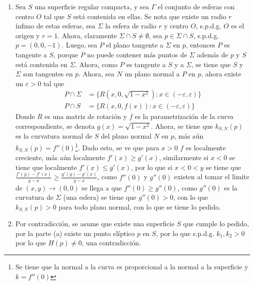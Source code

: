 \documentclass{homework}
\begin{document}
\begin{sol}[4]
    \begin{enumerate}
        \item Sea \(S\) una superficie regular compacta, y sea \(\Gamma\) el conjunto de esferas con centro \(O\) tal que \(S\) está contenida en ellas. Se nota que existe un radio \(r\) ínfimo de estas esferas, sea \(\Sigma\) la esfera de radio \(r\) y centro \(O\), s.p.d.g. \(O\) es el origen y \(r=1\). Ahora, claramente \(\Sigma\cap S\neq\emptyset\), sea \(p\in\Sigma\cap S\), s.p.d.g. \(p=(0,0,-1)\). Luego, sea \(P\) el plano tangente a \(\Sigma\) en \(p\), entonces \(P\) es tangente a \(S\), porque \(P\) no puede contener más puntos de \(\Sigma\) además de \(p\) y \(S\) está contenida en \(\Sigma\). Ahora, como \(P\) es tangente a \(S\) y a \(\Sigma\), se tiene que \(S\) y \(\Sigma\) son tangentes en \(p\). Ahora, sea \(N\) un plano normal a \(P\) en \(p\), ahora existe un \(\varepsilon>0\) tal que
        \begin{align*}
            P\cap\Sigma&=\{R(x,0,\sqrt{1-x^2}):x\in(-\varepsilon,\varepsilon)\}\\
            P\cap S&=\{R(x,0,f(x)):x\in(-\varepsilon,\varepsilon)\}
        \end{align*}
        Donde \(R\) es una matriz de rotación y \(f\) es la parametrización de la curva correspondiente, se denota \(g(x)=\sqrt{1-x^2}\). Ahora, se tiene que \(k_{S,N}(p)\) es la curvatura normal de \(S\) del plano normal \(N\) en \(p\), más aún \(k_{S,N}(p)=f''(0)\)\footnote{Se tiene que la normal a la curva es proporcional a la normal a la superficie y \(k=f''(0)\)}. Dado esto, se ve que para \(x>0\) \(f\) es localmente creciente, más aún localmente \(f'(x)\geq g'(x)\), similarmente si \(x<0\) se tiene que localmente \(f'(x)\leq g'(x)\), por lo que si \(x<0<y\) se tiene que \(\frac{f'(y)-f'(x)}{y-x}\geq\frac{g'(y)-g'(x)}{y-x}\), como \(f''(0)\) y \(g''(0)\) existen al tomar el limite de \((x,y)\rightarrow(0,0)\) se llega a que \(f''(0)\geq g''(0)\), como \(g''(0)\) es la curvatura de \(\Sigma\) (una esfera) se tiene que \(g''(0)>0\), con lo que \(k_{S,N}(p)>0\) para todo plano normal, con lo que se tiene lo pedido.
        \item Por contradicción, se asume que existe una superficie \(S\) que cumple lo pedido, por la parte (a) existe un punto elíptico \(p\) en \(S\), por lo que s.p.d.g. \(k_1,k_2>0\) por lo que \(H(p)\neq0\), una contradicción.
    \end{enumerate}
\end{sol}
\end{document}
